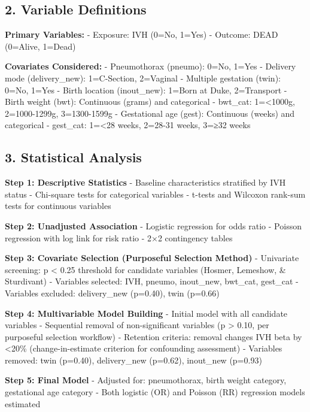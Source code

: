 \documentclass[
]{article}
\begin{document}
\hypertarget{variable-definitions}{%
\subsection{2. Variable Definitions}\label{variable-definitions}}

\textbf{Primary Variables:} - Exposure: IVH (0=No, 1=Yes) - Outcome:
DEAD (0=Alive, 1=Dead)

\textbf{Covariates Considered:} - Pneumothorax (pneumo): 0=No, 1=Yes -
Delivery mode (delivery\_new): 1=C-Section, 2=Vaginal - Multiple
gestation (twin): 0=No, 1=Yes - Birth location (inout\_new): 1=Born at
Duke, 2=Transport - Birth weight (bwt): Continuous (grams) and
categorical - bwt\_cat: 1=\textless1000g, 2=1000-1299g, 3=1300-1599g -
Gestational age (gest): Continuous (weeks) and categorical - gest\_cat:
1=\textless28 weeks, 2=28-31 weeks, 3=≥32 weeks

\hypertarget{statistical-analysis}{%
\subsection{3. Statistical Analysis}\label{statistical-analysis}}

\textbf{Step 1: Descriptive Statistics} - Baseline characteristics
stratified by IVH status - Chi-square tests for categorical variables -
t-tests and Wilcoxon rank-sum tests for continuous variables

\textbf{Step 2: Unadjusted Association} - Logistic regression for odds
ratio - Poisson regression with log link for risk ratio - 2×2
contingency tables

\textbf{Step 3: Covariate Selection (Purposeful Selection Method)} -
Univariate screening: p \textless{} 0.25 threshold for candidate
variables (Hosmer, Lemeshow, \& Sturdivant) - Variables selected: IVH,
pneumo, inout\_new, bwt\_cat, gest\_cat - Variables excluded:
delivery\_new (p=0.40), twin (p=0.66)

\textbf{Step 4: Multivariable Model Building} - Initial model with all
candidate variables - Sequential removal of non-significant variables (p
\textgreater{} 0.10, per purposeful selection workflow) - Retention
criteria: removal changes IVH beta by \textless20\% (change-in-estimate
criterion for confounding assessment) - Variables removed: twin
(p=0.40), delivery\_new (p=0.62), inout\_new (p=0.93)

\textbf{Step 5: Final Model} - Adjusted for: pneumothorax, birth weight
category, gestational age category - Both logistic (OR) and Poisson (RR)
regression models estimated
\end{document}
